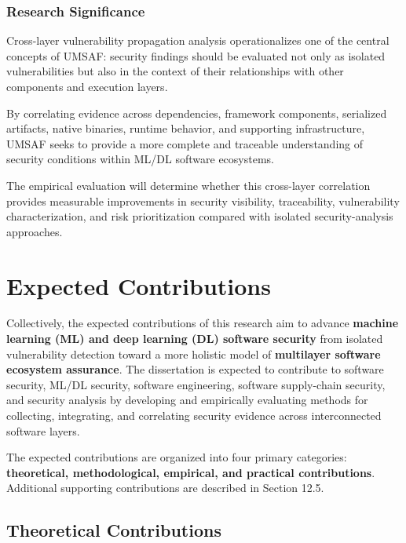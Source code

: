 \documentclass[
  12pt,
  letterpaper,
  oneside]{report}
\begin{document}
\subsection{Research Significance}\label{11129-research-significance}

Cross-layer vulnerability propagation analysis operationalizes one of
the central concepts of UMSAF: security findings should be evaluated not
only as isolated vulnerabilities but also in the context of their
relationships with other components and execution layers.

By correlating evidence across dependencies, framework components,
serialized artifacts, native binaries, runtime behavior, and supporting
infrastructure, UMSAF seeks to provide a more complete and traceable
understanding of security conditions within ML/DL software ecosystems.

The empirical evaluation will determine whether this cross-layer
correlation provides measurable improvements in security visibility,
traceability, vulnerability characterization, and risk prioritization
compared with isolated security-analysis approaches.

\chapter{Expected Contributions}\label{12-expected-contributions}

Collectively, the expected contributions of this research aim to advance
\textbf{machine learning (ML) and deep learning (DL) software security}
from isolated vulnerability detection toward a more holistic model of
\textbf{multilayer software ecosystem assurance}. The dissertation is
expected to contribute to software security, ML/DL security, software
engineering, software supply-chain security, and security analysis by
developing and empirically evaluating methods for collecting,
integrating, and correlating security evidence across interconnected
software layers.

The expected contributions are organized into four primary categories:
\textbf{theoretical, methodological, empirical, and practical
contributions}. Additional supporting contributions are described in
Section 12.5.

\section{Theoretical Contributions}\label{121-theoretical-contributions}
\end{document}
